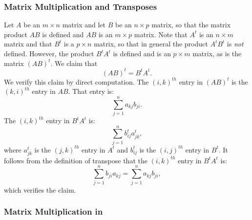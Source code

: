 \subsubsection*{Matrix Multiplication and Transposes}

Let $A$ be an $m\times n$ matrix and let $B$ be an $n\times p$
matrix, so that the matrix product $AB$ is defined and $AB$ is an
$m\times p$ matrix.  Note that $A^t$
is an $n\times m$ matrix and that $B^t$ is a $p\times n$ matrix, so
that in general the product $A^tB^t$ is {\em not\/} defined.  However,
the product $B^tA^t$ is defined and is an $p\times m$ matrix, as is
the matrix $(AB)^t$.  We claim that
\begin{equation}  \label{e:transposeprod}
(AB)^t = B^tA^t.
\end{equation}
We verify this claim by direct computation.  The $(i,k)^{th}$ entry
in $(AB)^t$ is the $(k,i)^{th}$ entry in $AB$.   That entry is:
\[
\sum_{j=1}^{n} a_{kj}b_{ji}.
\]
The $(i,k)^{th}$ entry in $B^tA^t$ is:
\[
\sum_{j=1}^n b^t_{ij}a^t_{jk},
\]
where $a^t_{jk}$ is the $(j,k)^{th}$ entry in $A^t$ and $b^t_{ij}$
is the $(i,j)^{th}$ entry in $B^t$.  It follows from the definition
of transpose that the $(i,k)^{th}$ entry in $B^tA^t$ is:
\[
\sum_{j=1}^n b_{ji}a_{kj} = \sum_{j=1}^n a_{kj}b_{ji},
\]
which verifies the claim.


\subsubsection*{Matrix Multiplication in \Matlab}

